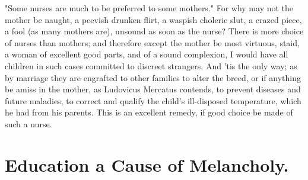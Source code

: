 "Some nurses are much to be preferred to some mothers."
For why may not the mother be naught, a peevish drunken flirt, a waspish
choleric slut, a crazed piece, a fool (as many mothers are), unsound as soon as
the nurse? There is more choice of nurses than mothers; and therefore except
the mother be most virtuous, staid, a woman of excellent good parts, and of a
sound complexion, I would have all children in such cases committed to discreet
strangers. And 'tis the only way; as by marriage they are engrafted to other
families to alter the breed, or if anything be amiss in the mother, as
Ludovicus Mercatus contends,  to prevent diseases and future maladies, to correct and qualify the
child's ill-disposed temperature, which he had from his parents. This is an
excellent remedy, if good choice be made of such a nurse.

\section{Education a Cause of Melancholy.}

